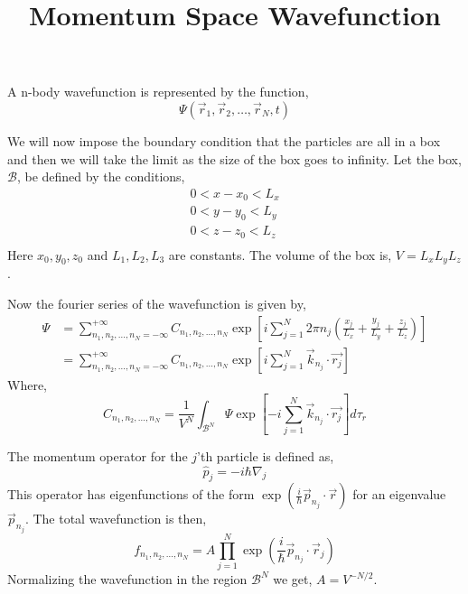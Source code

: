 \documentclass[a4paper, 11pt]{article}
\title{Momentum Space Wavefunction}
\author{}
\date{}
\begin{document}
\maketitle

A n-body wavefunction is represented by the function,
\begin{equation}
	\Psi(\vec{r}_1, \vec{r}_2, \ldots, \vec{r}_N, t)
\end{equation}

We will now impose the boundary condition that the particles are all in a box and then we will take
the limit as the size of the box goes to infinity. Let the box, $\mathcal{B}$, be defined by the conditions,
\begin{equation}
\begin{aligned}
	0 < x - x_0 < L_x \\
	0 < y - y_0 < L_y \\
	0 < z - z_0 < L_z \\
\end{aligned}
\end{equation}
Here $x_0, y_0, z_0$ and $L_1, L_2, L_3$ are constants. The volume of the box is, $V = L_x L_y L_z$.

Now the fourier series of the wavefunction is given by,
\begin{align}
	\Psi &= \sum_{n_1, n_2, \ldots, n_N = -\infty}^{+\infty} C_{n_1, n_2, \ldots, n_N} \exp \left[ i \sum_{j = 1}^N 2\pi n_j \left( \frac{x_j}{L_x} + \frac{y_j}{L_y} + \frac{z_j}{L_z}\right) \right] \\
	&= \sum_{n_1 , n_2, \ldots, n_N = -\infty}^{+\infty} C_{n_1, n_2, \ldots, n_N} \exp \left[ i \sum_{j = 1}^N \vec{k}_{n_j} \cdot \vec{r_j} \right]
\end{align}
Where,
\begin{equation}
	C_{n_1, n_2, \ldots, n_N} = \frac{1}{V^N} \int_{\mathcal{B}^N} \Psi \exp \left[ -i \sum_{j =
	1}^N \vec{k}_{n_j} \cdot \vec{r_j} \right] d\tau_r
\end{equation}

The momentum operator for the $j$'th particle is defined as,
\begin{equation}
	\hat{p}_j = -i \hbar \nabla_j
\end{equation}
This operator has eigenfunctions of the form $\exp( \frac{i}{\hbar} \vec{p}_{n_j} \cdot \vec{r} )$
for an eigenvalue $\vec{p}_{n_j}$. The total wavefunction is then,
\begin{equation}
	f_{n_1, n_2, \ldots, n_N} = A \prod_{j = 1}^N \exp( \frac{i}{\hbar} \vec{p}_{n_j} \cdot
	\vec{r}_j )
\end{equation}
Normalizing the wavefunction in the region $\mathcal{B}^N$ we get, $A = V^{-N/2}$.
\end{document}

